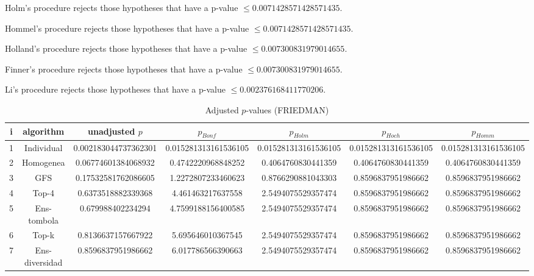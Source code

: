 \documentclass[a4paper,10pt]{article}
\begin{document}
\begin{landscape}
Holm's procedure rejects those hypotheses that have a p-value $\le0.0071428571428571435$.


Hommel's procedure rejects those hypotheses that have a p-value $\le0.0071428571428571435$.


Holland's procedure rejects those hypotheses that have a p-value $\le0.007300831979014655$.


Finner's procedure rejects those hypotheses that have a p-value $\le0.007300831979014655$.


Li's procedure rejects those hypotheses that have a p-value $\le0.002376168411770206$.



\newpage

\begin{table}[!htp]
\centering\scriptsize
\caption{Adjusted $p$-values (FRIEDMAN)}
\begin{tabular}{ccccccc}
i&algorithm&unadjusted $p$&$p_{Bonf}$&$p_{Holm}$&$p_{Hoch}$&$p_{Homm}$\\
\hline
1&Individual&0.002183044737362301&0.015281313161536105&0.015281313161536105&0.015281313161536105&0.015281313161536105\\
2&Homogenea&0.06774601384068932&0.4742220968848252&0.4064760830441359&0.4064760830441359&0.4064760830441359\\
3&GFS&0.17532581762086605&1.2272807233460623&0.8766290881043303&0.8596837951986662&0.8596837951986662\\
4&Top-4&0.6373518882339368&4.461463217637558&2.5494075529357474&0.8596837951986662&0.8596837951986662\\
5&Ens-tombola&0.679988402234294&4.7599188156400585&2.5494075529357474&0.8596837951986662&0.8596837951986662\\
6&Top-k&0.8136637157667922&5.695646010367545&2.5494075529357474&0.8596837951986662&0.8596837951986662\\
7&Ens-diversidad&0.8596837951986662&6.017786566390663&2.5494075529357474&0.8596837951986662&0.8596837951986662\\
\hline
\end{tabular}
\end{table}


\end{landscape}
\end{document}
